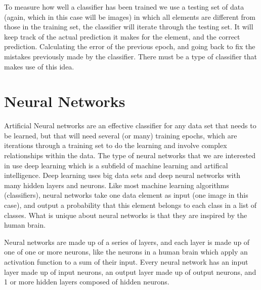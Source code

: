 \documentclass[12pt]{report} %
\begin{document}
	To measure how well a classifier has been trained we use a testing set of data (again, which in this case will be images) in which all elements are different from those in the training set, the classifier will iterate through the testing set. It will keep track of the actual prediction it makes for the element, and the correct prediction. Calculating the error of the previous epoch, and going back to fix the mistakes previously made by the classifier. There must be a type of classifier that makes use of this idea.
\chapter{Neural Networks}
	
	Artificial Neural networks are an effective classifier for any data set that needs to be learned, but that will need several (or many) training epochs, which are iterations through a training set to do the learning and involve complex relationships within the data. The type of neural networks that we are interested in use deep learning which is a subfield of machine learning and artifical intelligence. Deep learning uses big data sets and deep neural networks with many hidden layers and neurons\cite{deepMachineMastry}. Like most machine learning algorithms (classifiers), neural networks take one data element as input (one image in this case), and output a probability that this element belongs to each class in a list of classes. What is unique about neural networks is that they are inspired by the human brain. 
	
	Neural networks are made up of a series of layers, and each layer is made up of one of one or more neurons, like the neurons in a human brain which apply an activation function to a sum of their input. Every neural network has an input layer made up of input neurons, an output layer made up of output neurons, and 1 or more hidden layers composed of hidden neurons.
\end{document}
